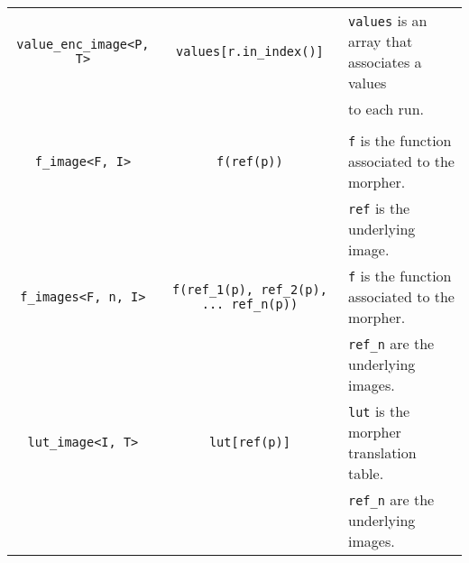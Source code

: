 \begin{tabular}{ccl}
\verb+value_enc_image<P, T>+ &
\lstinline+values[r.in_index()]+ &
\verb+values+ is an array that associates a values\\
&
&
to each run.\\

\\

\verb+f_image<F, I>+ &
\lstinline+f(ref(p))+ &
\verb+f+ is the function associated to the morpher.\\
&
&
\verb+ref+ is the underlying image.\\

\verb+f_images<F, n, I>+ &
\lstinline+f(ref_1(p), ref_2(p), ... ref_n(p))+ &
\verb+f+ is the function associated to the morpher.\\
&
&
\verb+ref_n+ are the underlying images.\\


\verb+lut_image<I, T>+ &
\lstinline+lut[ref(p)]+ &
\verb+lut+ is the morpher translation table.\\
&
&
\verb+ref_n+ are the underlying images.\\

\end{tabular}


